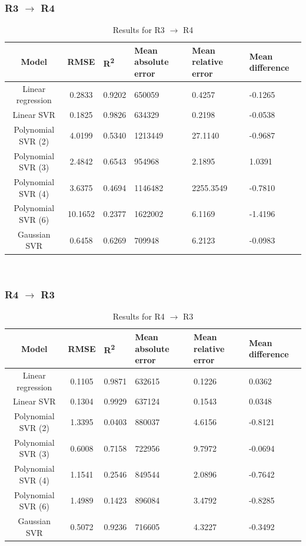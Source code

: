 \documentclass[a4paper,11pt]{article}
\begin{document}
\subsubsection{R3 $\rightarrow$ R4}
\begin{table}[H]
	\centering
	\begin{adjustbox}{center}
		\begin{tabular}{c | c M{1.2cm} M{2.5cm} M{2.5cm} M{1.8cm}}
			Model & RMSE & R\textsuperscript{2} & Mean absolute error & Mean relative error & Mean difference \tabularnewline
			\hline
			Linear regression & 0.2833 & 0.9202 & 650059 & 0.4257 & -0.1265 \\
			Linear SVR & 0.1825 & 0.9826 & 634329 & 0.2198 & -0.0538 \\
			Polynomial SVR (2) & 4.0199 & 0.5340 & 1213449 & 27.1140 & -0.9687 \\
			Polynomial SVR (3) & 2.4842 & 0.6543 & 954968 & 2.1895 & 1.0391 \\
			Polynomial SVR (4) & 3.6375 & 0.4694 & 1146482 & 2255.3549 & -0.7810 \\
			Polynomial SVR (6) & 10.1652 & 0.2377 & 1622002 & 6.1169 & -1.4196 \\
			Gaussian SVR & 0.6458 & 0.6269 & 709948 & 6.2123 & -0.0983 \\
		\end{tabular}
	\end{adjustbox}
	\\
	\caption{Results for R3 $\rightarrow$ R4 }
	\label{tab:query_comp_003}
\end{table}

\subsubsection{R4 $\rightarrow$ R3}
\begin{table}[H]
	\centering
	\begin{adjustbox}{center}
		\begin{tabular}{c | c M{1.2cm} M{2.5cm} M{2.5cm} M{1.8cm}}
			Model & RMSE & R\textsuperscript{2} & Mean absolute error & Mean relative error & Mean difference \tabularnewline
			\hline
			Linear regression & 0.1105 & 0.9871 & 632615 & 0.1226 & 0.0362 \\
			Linear SVR & 0.1304 & 0.9929 & 637124 & 0.1543 & 0.0348 \\
			Polynomial SVR (2) & 1.3395 & 0.0403 & 880037 & 4.6156 & -0.8121 \\
			Polynomial SVR (3) & 0.6008 & 0.7158 & 722956 & 9.7972 & -0.0694 \\
			Polynomial SVR (4) & 1.1541 & 0.2546 & 849544 & 2.0896 & -0.7642 \\
			Polynomial SVR (6) & 1.4989 & 0.1423 & 896084 & 3.4792 & -0.8285 \\
			Gaussian SVR & 0.5072 & 0.9236 & 716605 & 4.3227 & -0.3492 \\
		\end{tabular}
	\end{adjustbox}
	\\
	\caption{Results for R4 $\rightarrow$ R3 }
	\label{tab:query_comp_004}
\end{table}
\end{document}
